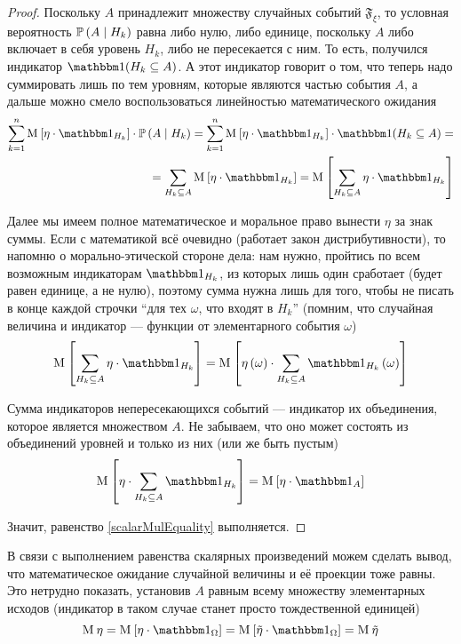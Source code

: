 \begin{proof}
Поскольку $A$ принадлежит множеству случайных событий $\mathfrak{F}_\xi$,
то условная вероятность $\mathbb{P}\left( A\;\middle|\; H_k \right)$ равна либо нулю, либо единице,
поскольку $A$ либо включает в себя уровень $H_k$, либо не пересекается с ним.
То есть, получился индикатор $\indicator{H_k \subseteq A}$.
А этот индикатор говорит о том, что теперь надо суммировать лишь по тем уровням,
которые являются частью события $A$,
а дальше можно смело воспользоваться линейностью математического ожидания
\begin{align*}
\sum_{k=1}^n \Mean{ \eta \cdot \indicatorof{H_k} }
    \cdot \probability{A \mcond H_k}
    = \sum_{k=1}^n \Mean{ \eta \cdot \indicatorof{H_k} }
        \cdot \indicator{H_k \subseteq A} = \\
    = \sum_{H_k \subseteq A} \Mean{ \eta \cdot \indicatorof{H_k} }
    = \Mean{ \sum_{H_k \subseteq A} \eta \cdot \indicatorof{H_k} }
\end{align*}

Далее мы имеем полное математическое и моральное право
вынести $\eta$ за знак суммы.
Если с математикой всё очевидно (работает закон дистрибутивности),
то напомню о морально-этической стороне дела: нам нужно,
пройтись по всем возможным индикаторам $\indicatorof{H_k}$,
из которых лишь один сработает (будет равен единице, а не нулю),
поэтому сумма нужна лишь для того,
чтобы не писать в конце каждой строчки ``для тех $\omega$, что входят в $H_k$''
(помним, что случайная величина и индикатор --- функции
от элементарного события $\omega$)
$$\Mean{ \sum_{H_k \subseteq A} \eta \cdot \indicatorof{H_k} }
    = \Mean{\eta \left( \omega \right) \cdot \sum_{H_k \subseteq A}
        \indicatorof{H_k}\left( \omega \right)}$$

Сумма индикаторов непересекающихся событий --- индикатор их объединения,
которое является множеством $A$.
Не забываем, что оно может состоять из объединений уровней и только из них
(или же быть пустым)
$$\Mean{ \eta \cdot \sum_{H_k \subseteq A} \indicatorof{H_k} }
    = \Mean{ \eta \cdot \indicatorof{A} }$$

Значит, равенство \eqref{scalarMulEquality} выполняется.
\end{proof}

\begin{remark}
    В связи с выполнением равенства скалярных произведений можем сделать вывод,
    что математическое ожидание случайной величины и её проекции тоже равны.
    Это нетрудно показать,
    установив $A$ равным всему множеству элементарных исходов
    (индикатор в таком случае станет просто тождественной единицей)
    $$\mean{\eta}
        = \Mean{ \eta \cdot \indicatorof{\Omega} }
        = \Mean{ \tilde{\eta} \cdot \indicatorof{\Omega} }
        = \mean{ \tilde{\eta} }$$
\end{remark}

